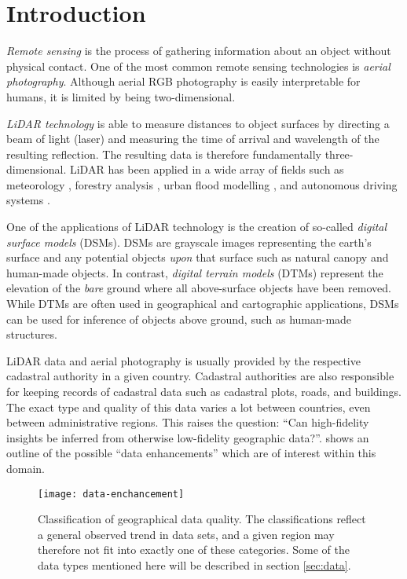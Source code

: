 \section*{Introduction}

\textit{Remote sensing} is the process of gathering information about an object without physical contact.
One of the most common remote sensing technologies is \textit{aerial photography}.
Although aerial RGB photography is easily interpretable for humans, it is limited by being two-dimensional.

\textit{LiDAR technology} is able to measure distances to object surfaces by directing a beam of light (laser) and measuring the time of arrival and wavelength of the resulting reflection.
The resulting data is therefore fundamentally three-dimensional.
LiDAR has been applied in a wide array of fields such as meteorology \cite{lidar_meteorology_1966}, forestry analysis \cite{lidar_forestry_2000}, urban flood modelling \cite{lidar_flood_2013}, and autonomous driving systems \cite{lidar_self_driving_2018}.

One of the applications of LiDAR technology is the creation of so-called \textit{digital surface models} (DSMs).
DSMs are grayscale images representing the earth's surface and any potential objects \textit{upon} that surface such as natural canopy and human-made objects.
In contrast, \textit{digital terrain models} (DTMs) represent the elevation of the \textit{bare} ground where all above-surface objects have been removed.
While DTMs are often used in geographical and cartographic applications, DSMs can be used for inference of objects above ground, such as human-made structures.

LiDAR data and aerial photography is usually provided by the respective cadastral authority in a given country.
Cadastral authorities are also responsible for keeping records of cadastral data such as cadastral plots, roads, and buildings.
The exact type and quality of this data varies a lot between countries, even between administrative regions.
This raises the question: \enquote{Can high-fidelity insights be inferred from otherwise low-fidelity geographic data?}.
 shows an outline of the possible \enquote{data enhancements} which are of interest within this domain.

\begin{figure}[htb]
  \texttt{[image: data-enchancement]}
  \caption{
    Classification of geographical data quality.
    The classifications reflect a general observed trend in data sets, and a given region may therefore not fit into exactly one of these categories.
    Some of the data types mentioned here will be described in section \ref{sec:data}.
  }
  \label{fig:data-enchancement}
\end{figure}

